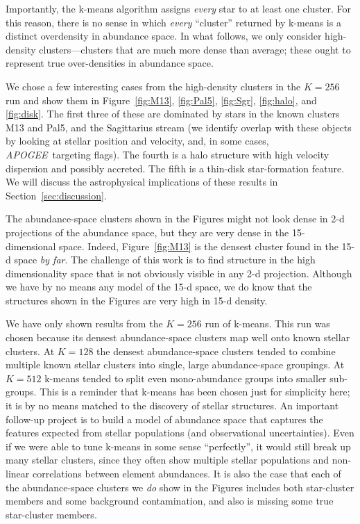 \documentclass[manuscript, letterpaper]{aastex6}
\newcommand{\acronym}[1]{{\small{#1}}}
\newcommand{\project}[1]{\textsl{#1}}
\newcommand{\apogee}{\project{\acronym{APOGEE}}}
\newcommand{\sectionname}{Section}
\renewcommand{\figurename}{Figure} %
\begin{document}
Importantly, the k-means algorithm assigns \emph{every} star to at
least one cluster.
For this reason, there is no sense in which \emph{every} ``cluster'' returned
by k-means is a distinct overdensity in abundance space.
In what follows, we only consider high-density clusters---clusters
that are much more dense than average; these ought to represent true
over-densities in abundance space.

We chose a few interesting cases from the high-density clusters
in the $K=256$ run and show them in
\figurename~\ref{fig:M13}, \ref{fig:Pal5}, \ref{fig:Sgr},
\ref{fig:halo}, and \ref{fig:disk}.
The first three of these are dominated by stars in the known clusters
M13 and Pal5, and the Sagittarius stream (we identify overlap with these objects
by looking at stellar position and velocity, and, in some cases,
\apogee\ targeting flags).
The fourth is a halo structure with high velocity dispersion and
possibly accreted.
The fifth is a thin-disk star-formation feature.
We will discuss the astrophysical implications of these results in
\sectionname~\ref{sec:discussion}.

The abundance-space clusters shown in the \figurename s
might not look dense in 2-d projections of the abundance space, but they
are very dense in the 15-dimensional space.  Indeed,
\figurename~\ref{fig:M13} is the densest cluster found in the 15-d
space \emph{by far}.
The challenge of this work is to find structure in the high
dimensionality space that is not obviously visible in any 2-d projection.
Although we have by no means any model of the 15-d space, we do know
that the structures shown in the \figurename s are very high in 15-d
density.

We have only shown results from the $K=256$ run of k-means.
This run was chosen because its densest abundance-space clusters map
well onto known stellar clusters.
At $K=128$ the densest abundance-space clusters tended to combine
multiple known stellar clusters into single, large abundance-space
groupings.
At $K=512$ k-means tended to split even mono-abundance groups into
smaller sub-groups.
This is a reminder that k-means has been chosen just for simplicity
here; it is by no means matched to the discovery of
stellar structures.
An important follow-up project is to build a model of abundance space
that captures the features expected from stellar populations (and observational uncertainties).
Even if we were able to tune k-means in some sense ``perfectly'', it
would still break up many stellar clusters, since they often show
multiple stellar populations and non-linear correlations between element abundances.
It is also the case that each of the abundance-space clusters we
\emph{do} show in the \figurename s includes both star-cluster members
and some background contamination, and also is missing some true
star-cluster members.
\end{document}

